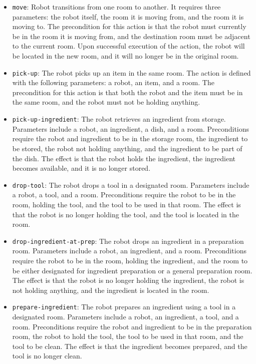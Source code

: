 \documentclass[a4paper,12pt]{article}
\begin{document}
\begin{itemize}
    \item \texttt{move}:  Robot transitions from one room to another. It requires three parameters: the robot itself, the room it is moving from, and the room it is moving to. The precondition for this action is that the robot must currently be in the room it is moving from, and the destination room must be adjacent to the current room. Upon successful execution of the action, the robot will be located in the new room, and it will no longer be in the original room.

    \item \texttt{pick-up}: The robot picks up an item in the same room. The action is defined with the following parameters: a robot, an item, and a room. The precondition for this action is that both the robot and the item must be in the same room, and the robot must not be holding anything.

    \item \texttt{pick-up-ingredient}: The robot retrieves an ingredient from storage. Parameters include a robot, an ingredient, a dish, and a room. Preconditions require the robot and ingredient to be in the storage room, the ingredient to be stored, the robot not holding anything, and the ingredient to be part of the dish. The effect is that the robot holds the ingredient, the ingredient becomes available, and it is no longer stored.

    \item \texttt{drop-tool}: The robot drops a tool in a designated room. Parameters include a robot, a tool, and a room. Preconditions require the robot to be in the room, holding the tool, and the tool to be used in that room. The effect is that the robot is no longer holding the tool, and the tool is located in the room.
    
    \item \texttt{drop-ingredient-at-prep}: The robot drops an ingredient in a preparation room. Parameters include a robot, an ingredient, and a room. Preconditions require the robot to be in the room, holding the ingredient, and the room to be either designated for ingredient preparation or a general preparation room. The effect is that the robot is no longer holding the ingredient, the robot is not holding anything, and the ingredient is located in the room.
    
    \item \texttt{prepare-ingredient}: The robot prepares an ingredient using a tool in a designated room. Parameters include a robot, an ingredient, a tool, and a room. Preconditions require the robot and ingredient to be in the preparation room, the robot to hold the tool, the tool to be used in that room, and the tool to be clean. The effect is that the ingredient becomes prepared, and the tool is no longer clean.


\end{itemize}
\end{document}
